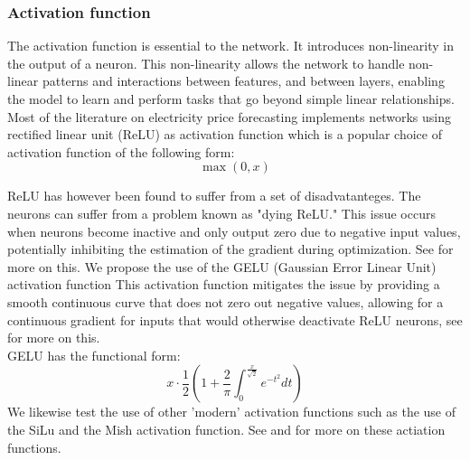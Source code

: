 \documentclass[10pt,a4paper]{article}
\numberwithin{equation}{section} %
\begin{document}
\subsubsection{Activation function}
The activation function is essential to the network. It introduces non-linearity in the output of a neuron. This non-linearity allows the network to handle non-linear patterns and interactions between features, and between layers, enabling the model to learn and perform tasks that go beyond simple linear relationships.\\
Most of the literature on electricity price forecasting implements networks using rectified linear unit (ReLU) as activation function which is a popular choice of activation function of the following form:
\begin{equation}
    \max{(0,x)} 
\end{equation}

ReLU has however been found to suffer from a set of disadvatanteges.
The neurons can suffer from a problem known as "dying ReLU." 
This issue occurs when neurons become inactive and only output
zero due to negative input values, potentially inhibiting the estimation of the gradient during optimization.
See \cite{lu2019dying} for more on this.
We propose the use of the GELU (Gaussian Error Linear Unit) activation function This activation function mitigates the issue by providing a smooth continuous curve that does not zero out negative values, allowing for a continuous gradient for inputs that would otherwise deactivate ReLU neurons, see \cite{hendrycks2023gaussian} for more on this.\\
GELU has the functional form:
\begin{equation}
    x \cdot \frac{1}{2} \left( 1 + \frac{2}{\pi} \int^{ \frac{x}{\sqrt{2}} }_{0} e^{-t^2} dt \right)
\end{equation}
We likewise test the use of other 'modern' activation functions such as the use of the SiLu and the Mish activation function. 
See \cite{misra2020mish} and \cite{ramachandran2017searching} for more on these actiation functions.
\end{document}
